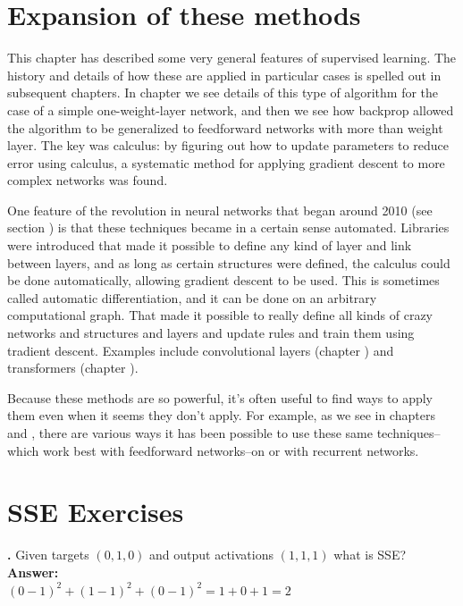  \section{Expansion of these methods}
 
 This chapter has described some very general features of supervised learning. The history and details of how these are applied in particular cases is spelled out in subsequent chapters.  In chapter  we see details of this type of algorithm for the case of a simple one-weight-layer network, and then we see how backprop allowed the algorithm to be generalized to feedforward networks with more than weight layer. The key was calculus: by figuring out how to update parameters to reduce error using calculus, a systematic method for applying gradient descent to more complex networks was found.
 
One feature of the revolution in neural networks that began around 2010 (see section ) is that these techniques became in a certain sense automated. Libraries were introduced that made it possible to define any kind of layer and link between layers, and as long as certain structures were defined, the calculus could be done automatically, allowing gradient descent to be used.  This is sometimes called automatic differentiation, and it can be done on an arbitrary computational graph.  That made it possible to really define all kinds of crazy networks and structures and layers and update rules and train them using tradient descent. Examples include convolutional layers (chapter ) and transformers  (chapter ).
 
Because these methods are so powerful, it's often useful to find ways to apply them even when it seems they don't apply. For example, as we see in chapters  and , there are various ways it has been possible to use these same techniques--which work best with feedforward networks--on or with recurrent networks.  
 
\section{SSE Exercises}


\noindent
{}
{\bf \theSSECounter.}  Given targets $(0,1,0)$ and output activations $(1,1,1)$ what is SSE? \\
{\bf Answer:}  \\
$(0-1)^2 + (1-1)^2 + (0-1)^2 = 1 + 0 + 1 = 2$
\bigskip

